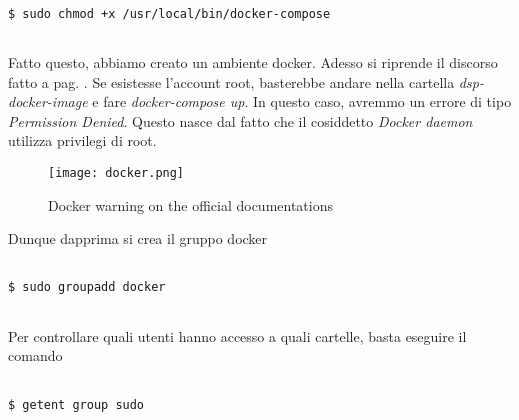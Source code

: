 \documentclass[14pt]{extreport}
\begin{document}
\vspace{10pt}

{
\small
\begin{tcolorbox}

\begin{verbatim}

$ sudo chmod +x /usr/local/bin/docker-compose
  
\end{verbatim}

\end{tcolorbox}
}

\vspace{18pt}

Fatto questo, abbiamo creato un ambiente docker. Adesso si riprende il discorso fatto a pag. \pageref{Config}. Se esistesse l'account root, basterebbe andare nella cartella \textit{dsp-docker-image}
e fare \textit{docker-compose up}. In questo caso, avremmo un errore di tipo \textit{Permission Denied}. Questo nasce dal fatto che il cosiddetto \textit{Docker daemon} utilizza privilegi di root. 

\begin{figure}[H]
    \centering
    \texttt{[image: docker.png]}
    \caption{Docker warning on the official documentations}
    \label{dock}
\end{figure}

Dunque dapprima si crea il gruppo docker

\vspace{10pt}

{
\small
\begin{tcolorbox}

\begin{verbatim}

$ sudo groupadd docker
  
\end{verbatim}

\end{tcolorbox}
}

\vspace{18pt}

Per controllare quali utenti hanno accesso a quali cartelle, basta eseguire il comando

\vspace{10pt}

{
\small
\begin{tcolorbox}

\begin{verbatim}

$ getent group sudo
  
\end{verbatim}

\end{tcolorbox}
}
\end{document}
